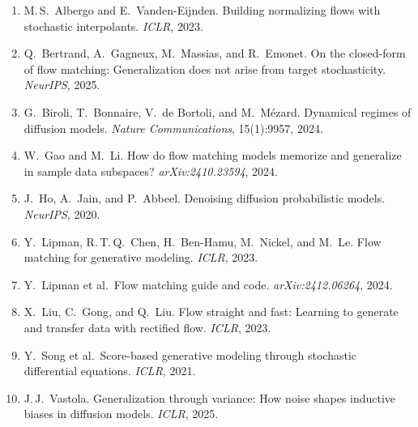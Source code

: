 \documentclass[11pt, a4paper]{article}
\theoremstyle{plain}
\theoremstyle{definition}
\theoremstyle{remark}
\begin{document}
\begin{enumerate}
  \item M.\,S.\ Albergo and E.\ Vanden-Eijnden. Building normalizing flows with stochastic interpolants. \textit{ICLR}, 2023.
  \item Q.\ Bertrand, A.\ Gagneux, M.\ Massias, and R.\ Emonet. On the closed-form of flow matching: Generalization does not arise from target stochasticity. \textit{NeurIPS}, 2025.
  \item G.\ Biroli, T.\ Bonnaire, V.\ de Bortoli, and M.\ M\'{e}zard. Dynamical regimes of diffusion models. \textit{Nature Communications}, 15(1):9957, 2024.
  \item W.\ Gao and M.\ Li. How do flow matching models memorize and generalize in sample data subspaces? \textit{arXiv:2410.23594}, 2024.
  \item J.\ Ho, A.\ Jain, and P.\ Abbeel. Denoising diffusion probabilistic models. \textit{NeurIPS}, 2020.
  \item Y.\ Lipman, R.\,T.\,Q.\ Chen, H.\ Ben-Hamu, M.\ Nickel, and M.\ Le. Flow matching for generative modeling. \textit{ICLR}, 2023.
  \item Y.\ Lipman et al.\ Flow matching guide and code. \textit{arXiv:2412.06264}, 2024.
  \item X.\ Liu, C.\ Gong, and Q.\ Liu. Flow straight and fast: Learning to generate and transfer data with rectified flow. \textit{ICLR}, 2023.
  \item Y.\ Song et al.\ Score-based generative modeling through stochastic differential equations. \textit{ICLR}, 2021.
  \item J.\,J.\ Vastola. Generalization through variance: How noise shapes inductive biases in diffusion models. \textit{ICLR}, 2025.
\end{enumerate}
\end{document}
